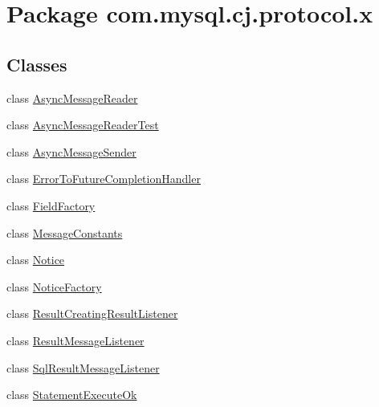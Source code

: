 \hypertarget{namespacecom_1_1mysql_1_1cj_1_1protocol_1_1x}{}\section{Package com.\+mysql.\+cj.\+protocol.\+x}
\label{namespacecom_1_1mysql_1_1cj_1_1protocol_1_1x}
\subsection*{Classes}
\begin{DoxyCompactItemize}
\item 
class \mbox{\hyperlink{classcom_1_1mysql_1_1cj_1_1protocol_1_1x_1_1_async_message_reader}{Async\+Message\+Reader}}
\item 
class \mbox{\hyperlink{classcom_1_1mysql_1_1cj_1_1protocol_1_1x_1_1_async_message_reader_test}{Async\+Message\+Reader\+Test}}
\item 
class \mbox{\hyperlink{classcom_1_1mysql_1_1cj_1_1protocol_1_1x_1_1_async_message_sender}{Async\+Message\+Sender}}
\item 
class \mbox{\hyperlink{classcom_1_1mysql_1_1cj_1_1protocol_1_1x_1_1_error_to_future_completion_handler}{Error\+To\+Future\+Completion\+Handler}}
\item 
class \mbox{\hyperlink{classcom_1_1mysql_1_1cj_1_1protocol_1_1x_1_1_field_factory}{Field\+Factory}}
\item 
class \mbox{\hyperlink{classcom_1_1mysql_1_1cj_1_1protocol_1_1x_1_1_message_constants}{Message\+Constants}}
\item 
class \mbox{\hyperlink{classcom_1_1mysql_1_1cj_1_1protocol_1_1x_1_1_notice}{Notice}}
\item 
class \mbox{\hyperlink{classcom_1_1mysql_1_1cj_1_1protocol_1_1x_1_1_notice_factory}{Notice\+Factory}}
\item 
class \mbox{\hyperlink{classcom_1_1mysql_1_1cj_1_1protocol_1_1x_1_1_result_creating_result_listener}{Result\+Creating\+Result\+Listener}}
\item 
class \mbox{\hyperlink{classcom_1_1mysql_1_1cj_1_1protocol_1_1x_1_1_result_message_listener}{Result\+Message\+Listener}}
\item 
class \mbox{\hyperlink{classcom_1_1mysql_1_1cj_1_1protocol_1_1x_1_1_sql_result_message_listener}{Sql\+Result\+Message\+Listener}}
\item 
class \mbox{\hyperlink{classcom_1_1mysql_1_1cj_1_1protocol_1_1x_1_1_statement_execute_ok}{Statement\+Execute\+Ok}}

\end{DoxyCompactItemize}
